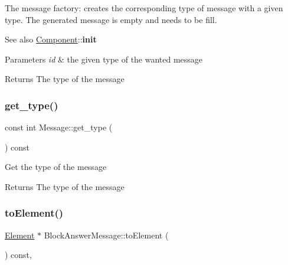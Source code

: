 The message factory\+: creates the corresponding type of message with a given type. The generated message is empty and needs to be fill. \begin{DoxySeeAlso}{See also}
\mbox{\hyperlink{classComponent}{Component}}\+:\+:{\bfseries init}
\end{DoxySeeAlso}

\begin{DoxyParams}{Parameters}
{\em id} & the given type of the wanted message \\
\hline
\end{DoxyParams}
\begin{DoxyReturn}{Returns}
The type of the message 
\end{DoxyReturn}
\mbox{\label{classMessage_a2a576dcffd45c4574fcdf2897ec26086}} 
\subsubsection{\texorpdfstring{get\+\_\+type()}{get\_type()}}
{\footnotesize\ttfamily const int Message\+::get\+\_\+type (\begin{DoxyParamCaption}{ }\end{DoxyParamCaption}) const\hspace{0.3cm}{\ttfamily [inherited]}}

Get the type of the message

\begin{DoxyReturn}{Returns}
The type of the message 
\end{DoxyReturn}
\mbox{\label{classBlockAnswerMessage_ac7f35ec9f7f2fbcd726628c2a984518b}} 
\subsubsection{\texorpdfstring{to\+Element()}{toElement()}}
{\footnotesize\ttfamily \mbox{\hyperlink{classElement}{Element}} $\ast$ Block\+Answer\+Message\+::to\+Element (\begin{DoxyParamCaption}{ }\end{DoxyParamCaption}) const\hspace{0.3cm}{\ttfamily [override]}, {\ttfamily [virtual]}}

